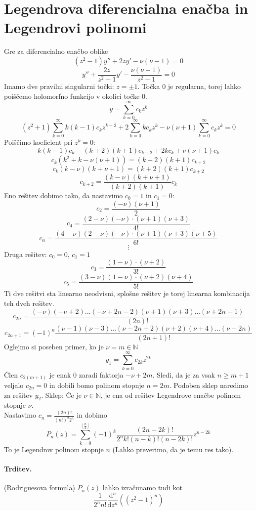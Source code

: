 \documentclass[a4paper]{article}
\newcommand{\dd}[2]{\frac{\mathrm{d} {#1}}{\mathrm{d} {#2}}}
\newcommand{\N}{\mathbb{N}}
\newcommand{\Sum}[2][0]{\sum_{{#2} = {#1}}^{\infty}}
\begin{document}
\section{Legendrova diferencialna enačba in Legendrovi polinomi}
Gre za diferencialno enačbo oblike $$(z^2 - 1)y'' + 2zy' - \nu(\nu - 1) = 0$$
$$y'' + \frac{2z}{z^2 - 1}y' - \frac{\nu(\nu-1)}{z^2 - 1} = 0$$
Imamo dve pravilni singularni točki: $z = \pm 1$. Točka $0$ je regularna, torej lahko poiščemo holomorfno funkcijo v okolici točke $0$.
$$y  = \Sum{k} c_kz^k$$
$$(z^2 + 1)\Sum{k} k(k-1)c_kz^{k-2} + 2\Sum{k}kc_kz^k - \nu(\nu + 1)\Sum{k} c_kz^k = 0$$
Poiščimo koeficient pri $z^k = 0$:
$$k(k-1)c_k - (k+2)(k+1)c_{k+2} + 2kc_k + \nu(\nu + 1)c_k$$
$$c_k\left(k^2 + k - \nu(\nu + 1)\right) = (k+2)(k+1)c_{k+2}$$
$$c_k(k - \nu)(k + \nu + 1) = (k+2)(k+1)c_{k+2}$$
$$c_{k+2} = \frac{(k-\nu)(k+\nu+1)}{(k+2)(k+1)}c_k$$
Eno rešitev dobimo tako, da nastavimo $c_0 = 1$ in $c_1 = 0$:
$$c_2 = \frac{(-\nu)(\nu + 1)}{2}$$
$$c_4 = \frac{(2-\nu)(-\nu)\cdot(\nu + 1)(\nu + 3)}{4!}$$
$$c_6 = \frac{(4-\nu)(2-\nu)(-\nu)\cdot(\nu + 1)(\nu + 3)(\nu + 5)}{6!}$$
$$\vdots$$
Druga rešitev: $c_0 = 0$, $c_1 = 1$
$$c_3 = \frac{(1-\nu)\cdot(\nu+2)}{3!}$$
$$c_5 = \frac{(3-\nu)(1-\nu)\cdot(\nu + 2)(\nu + 4)}{5!}$$
Ti dve rešitvi sta linearno neodvisni, splošne rešitev je torej linearna kombinacija teh dveh rešitev.
$$c_{2n} = \frac{(-\nu)(-\nu+2)...(-\nu + 2n - 2)(\nu + 1)(\nu + 3) ... (\nu + 2n - 1)}{(2n)!}$$
$$c_{2n+1} = (-1)^n \frac{(\nu - 1)(\nu - 3)...(\nu - 2n + 2)(\nu + 2)(\nu + 4) ... (\nu + 2n)}{(2n+1)!}$$
Oglejmo si poseben primer, ko je $\nu = m \in \N$
$$y_1 = \Sum{k} c_{2k}z^{2k}$$
Člen $c_{2(m+1)}$ je enak $0$ zaradi faktorja $-\nu + 2m$. Sledi, da je za vsak $n \geq m+1$ veljalo $c_{2n} = 0$ in dobili bomo polinom stopnje $n = 2m$.
Podoben sklep naredimo za rešitev $y_2$. Sklep: Če je $\nu \in \N$, je ena od rešitev Legendrove enačbe polinom stopnje $\nu$. \\[2mm]
Nastavimo $\displaystyle{c_n = \frac{(2n)!}{(n!)^2 2^n}}$ in dobimo
$$P_n(z) = \sum_{k=0}^{\lfloor\frac{n}{2}\rfloor}(-1)^k \frac{(2n-2k)!}{2^n k! (n-k)!(n-2k)!}z^{n-2k}$$
To je Legendrov polinom stopnje $n$ (Lahko preverimo, da je temu res tako).
\paragraph{Trditev.} (Rodriguesova formula) $P_n(z)$ lahko izračunamo tudi kot $$\frac{1}{2^n n!}\dd{^n}{z^n}\left((z^2 - 1)^n\right)$$
\end{document}
